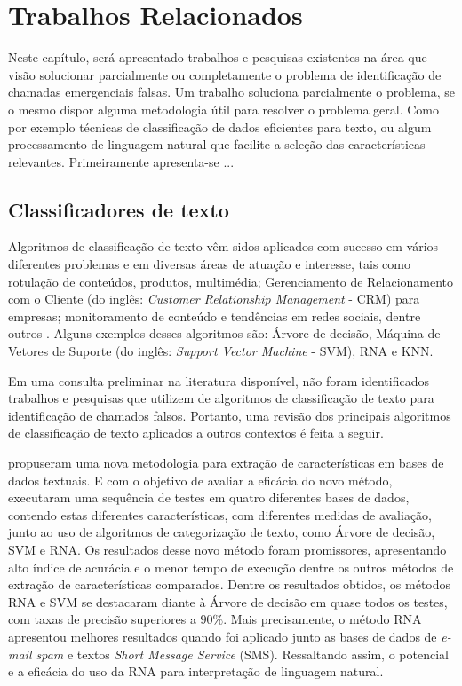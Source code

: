 \chapter{Trabalhos Relacionados}
Neste capítulo, será apresentado trabalhos e pesquisas existentes na área que visão solucionar parcialmente ou completamente o problema de identificação de chamadas emergenciais falsas. Um trabalho soluciona parcialmente o problema, se o mesmo dispor alguma metodologia útil para resolver o problema geral. Como por exemplo técnicas de classificação de dados eficientes para texto, ou algum processamento de linguagem natural que facilite a seleção das características relevantes. Primeiramente apresenta-se ...

\section{Classificadores de texto}
Algoritmos de classificação de texto vêm sidos aplicados com sucesso em vários diferentes problemas e em diversas áreas de atuação e interesse, tais como rotulação de conteúdos, produtos, multimédia; Gerenciamento de Relacionamento com o Cliente (do inglês: \textit{Customer Relationship Management} - CRM) para empresas; monitoramento de conteúdo e tendências em redes sociais, dentre outros \citep{uysal2012novel, gupta2018text}. Alguns exemplos desses algoritmos são: Árvore de decisão, Máquina de Vetores de Suporte (do inglês: \textit{Support Vector Machine} - SVM), RNA e KNN.

Em uma consulta preliminar na literatura disponível, não foram identificados trabalhos e pesquisas que utilizem de algoritmos de classificação de texto para identificação de chamados falsos. Portanto, uma revisão dos principais algoritmos de classificação de texto aplicados a outros contextos é feita a seguir.

\cite{uysal2012novel} propuseram uma nova metodologia para extração de características em bases de dados textuais. E com o objetivo de avaliar a eficácia do novo método, executaram uma sequência de testes em quatro diferentes bases de dados, contendo estas diferentes características, com diferentes medidas de avaliação, junto ao uso de algoritmos de categorização de texto, como Árvore de decisão, SVM e RNA. Os resultados desse novo método foram promissores, apresentando alto índice de acurácia e o menor tempo de execução dentre os outros métodos de extração de características comparados. Dentre os resultados obtidos, os métodos RNA e SVM se destacaram diante à Árvore de decisão em quase todos os testes, com taxas de precisão superiores a $90\%$. Mais precisamente, o método RNA apresentou melhores resultados quando foi aplicado junto as bases de dados de \textit{e-mail spam} e textos \textit{Short Message Service} (SMS). Ressaltando assim, o potencial e a eficácia do uso da RNA para interpretação de linguagem natural.

